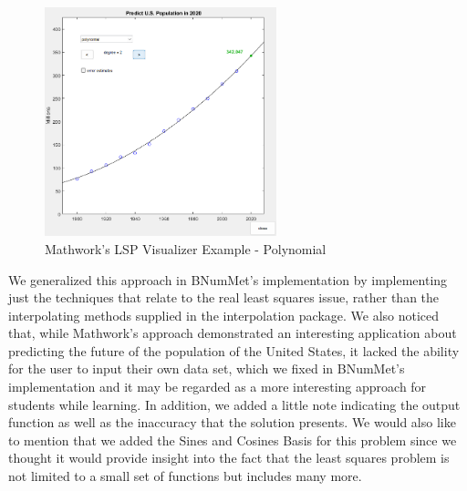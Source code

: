 \begin{figure}[H]
    \centering
    \includegraphics[width=0.6\textwidth]{Include/Images/Thesis/Development/Visualizers/LSP/Mathworks.LSP.Ex1.3.png}
    \caption{Mathwork's \cite{doi:10.1137/1.9780898717952} LSP Visualizer Example - Polynomial}
    \label{fig:Mathwork's Least Squares Visualizer Example- Polynomial}
\end{figure}

We generalized this approach in BNumMet's implementation by implementing just the techniques that relate to the real least squares issue, rather than the interpolating methods supplied in the interpolation package. We also noticed that, while Mathwork's approach demonstrated an interesting application about predicting the future of the population of the United States, it lacked the ability for the user to input their own data set, which we fixed in BNumMet's implementation and it may be regarded as a more interesting approach for students while learning.  In addition, we added a little note indicating the output function as well as the inaccuracy that the solution presents. We would also like to mention that we added the Sines and Cosines Basis for this problem since we thought it would provide insight into the fact that the least squares problem is not limited to a small set of functions but includes many more.

